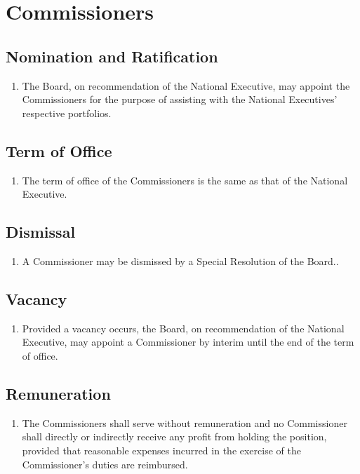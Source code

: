 \section{Commissioners}
\label{commissioners}

\subsection{Nomination and Ratification}
\label{commissioners-nomination-and-ratification}

\begin{enumerate}
 \item The Board, on recommendation of the National Executive, may appoint the Commissioners for the purpose of assisting with the National Executives’ respective portfolios.
\end{enumerate}

\subsection{Term of Office}
\label{commissioners-term-of-office}

\begin{enumerate}
 \item The term of office of the Commissioners is the same as that of the National Executive.
\end{enumerate}

\subsection{Dismissal}
\label{commissioners-dismissal}

\begin{enumerate}
 \item A Commissioner may be dismissed by a Special Resolution of the Board..
\end{enumerate}

\subsection{Vacancy}
\label{commissioners-vacancy}

\begin{enumerate}
 \item Provided a vacancy occurs, the Board, on recommendation of the National Executive, may appoint a Commissioner by interim until the end of the term of office.
\end{enumerate}

\subsection{Remuneration}
\label{commissioners-remuneration}

\begin{enumerate}
 \item The Commissioners shall serve without remuneration and no Commissioner shall directly or indirectly receive any profit from holding the position, provided that reasonable expenses incurred in the exercise of the Commissioner’s duties are reimbursed.
\end{enumerate}
